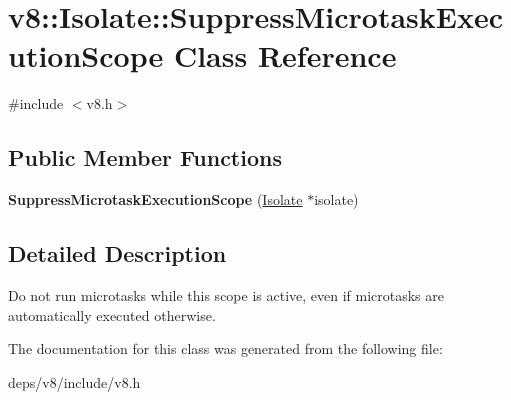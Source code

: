 \hypertarget{classv8_1_1_isolate_1_1_suppress_microtask_execution_scope}{}\section{v8\+:\+:Isolate\+:\+:Suppress\+Microtask\+Execution\+Scope Class Reference}
\label{classv8_1_1_isolate_1_1_suppress_microtask_execution_scope}


{\ttfamily \#include $<$v8.\+h$>$}

\subsection*{Public Member Functions}
\begin{DoxyCompactItemize}
\item 
\hypertarget{classv8_1_1_isolate_1_1_suppress_microtask_execution_scope_a846d7dd39f4cfad4dfc4c8c785e4a65e}{}{\bfseries Suppress\+Microtask\+Execution\+Scope} (\hyperlink{classv8_1_1_isolate}{Isolate} $\ast$isolate)\label{classv8_1_1_isolate_1_1_suppress_microtask_execution_scope_a846d7dd39f4cfad4dfc4c8c785e4a65e}

\end{DoxyCompactItemize}


\subsection{Detailed Description}
Do not run microtasks while this scope is active, even if microtasks are automatically executed otherwise. 

The documentation for this class was generated from the following file\+:\begin{DoxyCompactItemize}
\item 
deps/v8/include/v8.\+h\end{DoxyCompactItemize}
